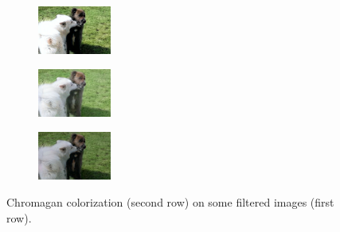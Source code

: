 \begin{figure}[t]
\begin{subfigure}[b]{0.1\textwidth}
		\end{subfigure}
		\hfill
		\begin{subfigure}[b]{0.1\textwidth}
			\includegraphics[width=2.4cm]{c - filter - man contr (2).jpg}
	
		\end{subfigure}
		\hfill
		\begin{subfigure}[b]{0.1\textwidth}
			\includegraphics[width=2.4cm]{c - filter - lumin (1).jpeg}
	
		\end{subfigure}
		\hfill
		\begin{subfigure}[b]{0.1\textwidth}
			\includegraphics[width=2.4cm]{c - filter - lumin (2).jpeg}
	
		\end{subfigure}
	\caption{{\small Chromagan colorization (second row) on some filtered images (first row).}}
	\label{fig:filter}
\end{figure}
